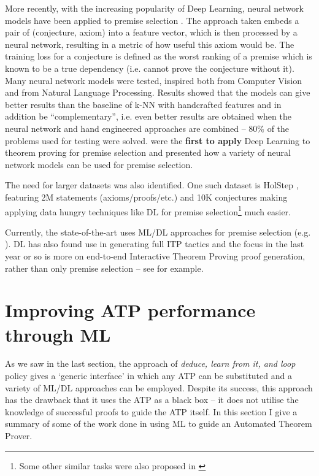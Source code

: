 \documentclass{article}
\begin{document}
More recently, with the increasing popularity of Deep Learning, neural network
models have been applied to premise selection \citep{DeepMath}. The approach
taken embeds a pair of (conjecture, axiom) into a feature vector, which is then
processed by a neural network, resulting in a metric of how useful this axiom
would be. The training loss for a conjecture is defined as the worst ranking of
a premise which is known to be a true dependency (i.e. cannot prove the
conjecture without it). Many neural network models were tested, inspired both
from Computer Vision and from Natural Language Processing. Results showed that
the models can give better results than the baseline of k-NN with handcrafted
features and in addition be ``complementary'', i.e. even better results are
obtained when the neural network and hand engineered approaches are combined --
80\% of the problems used for testing were solved. \cite{DeepMath} were the
\textbf{first to apply} Deep Learning to theorem proving for premise selection
and presented how a variety of neural network models can be used for premise
selection.

The need for larger datasets was also identified. One such dataset is HolStep
\citep{HolStep}, featuring 2M statements (axioms/proofs/etc.) and 10K
conjectures making applying data hungry techniques like DL for premise
selection\footnote{Some other similar tasks were also proposed in
\cite{HolStep}} much easier.

Currently, the state-of-the-art uses ML/DL approaches for premise selection
(e.g. \cite{DeepGraph}). DL has also found use in generating full ITP
tactics and the focus in the last year or so is more on end-to-end Interactive
Theorem Proving proof generation, rather than only premise selection -- see
\cite{LearningToProveITP, GamePad} for example.

\section{Improving ATP performance through ML}

As we saw in the last section, the approach of \emph{deduce, learn from it, and
loop} policy gives a `generic interface' in which any ATP can be substituted
and a variety of ML/DL approaches can be employed. Despite its success, this
approach has the drawback that it uses the ATP as a black box -- it does not
utilise the knowledge of successful proofs to guide the ATP itself. In this
section I give a summary of some of the work done in using ML to guide an
Automated Theorem Prover.
\end{document}
